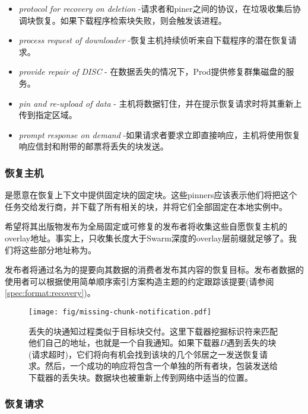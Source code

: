 \begin{itemize}
\item \emph{protocol for recovery on deletion} -请求者和piner之间的协议，在垃圾收集后协调块恢复。如果下载程序检索块失败，则会触发该进程。
\item \emph{process request of downloader} -恢复主机持续侦听来自下载程序的潜在恢复请求。
\item \emph{provide repair of DISC} - 
在数据丢失的情况下，Prod提供修复群集磁盘的服务。
\item \emph{pin and re-upload of data} -     
主机将数据钉住，并在提示恢复请求时将其重新上传到指定区域。 
\item \emph{prompt response on demand} -如果请求者要求立即直接响应，主机将使用恢复响应信封和附带的邮票将丢失的块发送。
\end{itemize}

\subsubsection{恢复主机}

是愿意在恢复上下文中提供固定块的固定块。这些pinners应该表示他们将把这个任务交给发行商，并下载了所有相关的块，并将它们全部固定在本地实例中。 

希望将其出版物发布为全局固定或可修复的发布者将收集这些自愿恢复主机的overlay地址。事实上，只收集长度大于Swarm深度的overlay层前缀就足够了。我们将这些部分地址称为。

发布者将通过名为的提要向其数据的消费者发布其内容的恢复目标。发布者数据的使用者可以根据使用简单顺序索引方案构造主题的约定跟踪该提要(请参阅\ref{spec:format:recovery})。 

\begin{figure}[htbp]
\centering
\texttt{[image: fig/missing-chunk-notification.pdf]} \caption[缺少块通知进程\statusgreen]{丢失的块通知过程类似于目标块交付。这里下载器挖掘标识符来匹配他们自己的地址，也就是一个自我通知。如果下载器$D$遇到丢失的块(请求超时)，它们将向有机会找到该块的几个邻居之一发送恢复请求。然后，一个成功的响应将包含一个单独的所有者块，包装发送给下载器的丢失块。数据块也被重新上传到网络中适当的位置。}
\label{fig:missing-chunk-notification}
\end{figure}

\subsubsection{恢复请求}

